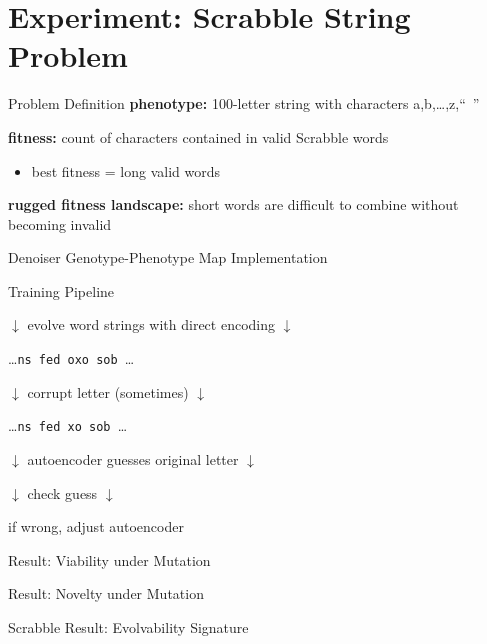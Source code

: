 \section{Experiment: Scrabble String Problem}

\begin{frame}{Problem Definition}
\textbf{phenotype:} 100-letter string with characters a,b,\dots,z,``~''
\vspace{2ex}
\pause

\textbf{fitness:} count of characters contained in valid Scrabble words
\begin{itemize}
\item best fitness = long valid words
\end{itemize}

\vspace{2ex}
\pause

\textbf{rugged fitness landscape:}
short words are difficult to combine without becoming invalid

\end{frame}

\begin{frame}{Denoiser Genotype-Phenotype Map Implementation}



\end{frame}

\begin{frame}{Training Pipeline}

\centering \Large

\textcolor{h2}{$\downarrow$ evolve word strings with direct encoding $\downarrow$}

\dots\texttt{ns fed oxo sob }\dots

\pause

\textcolor{h2}{$\downarrow$ corrupt letter (sometimes) $\downarrow$}

\dots\texttt{ns fed xo sob }\dots

\pause

\textcolor{h2}{$\downarrow$ autoencoder guesses original letter $\downarrow$}

\texttt{}

\pause

\textcolor{h2}{$\downarrow$ check guess $\downarrow$}

if wrong, adjust autoencoder

\end{frame}

\begin{frame}{Result: Viability under Mutation}



\end{frame}

\begin{frame}{Result: Novelty under Mutation}



\end{frame}

\begin{frame}{Scrabble Result: Evolvability Signature}



\end{frame}
